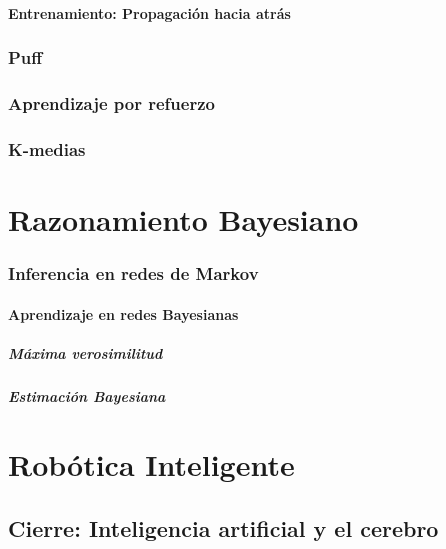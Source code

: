 \documentclass[12pt,openany]{book}
\begin{document}
\subsection{Entrenamiento: Propagación hacia atrás}

\section{Puff}
\section{Aprendizaje por refuerzo}
\section{K-medias}


\part{Razonamiento Bayesiano}







\section{Inferencia en redes de Markov}

\subsection{Aprendizaje en redes Bayesianas}
\subsubsection{Máxima verosimilitud}
\subsubsection{Estimación Bayesiana}


\part{Robótica Inteligente}
\chapter{Cierre: Inteligencia artificial y el cerebro}

\backmatter

\printbibliography[heading=bibintoc]
\end{document}
